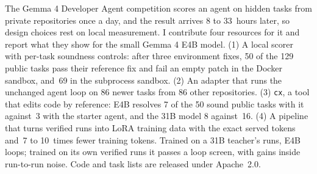 The Gemma 4 Developer Agent competition scores an agent on hidden tasks from private repositories once a day, and the result arrives 8 to 33~hours later, so design choices rest on local measurement. I contribute four resources for it and report what they show for the small Gemma 4 E4B model. (1) A local scorer with per-task soundness controls: after three environment fixes, 50 of the 129 public tasks pass their reference fix and fail an empty patch in the Docker sandbox, and~69 in the subprocess sandbox. (2) An adapter that runs the unchanged agent loop on 86 newer tasks from 86 other repositories. (3) \texttt{cx}, a tool that edits code by reference: E4B resolves 7 of the 50 sound public tasks with it against~3 with the starter agent, and the 31B model 8 against~16. (4) A pipeline that turns verified runs into LoRA training data with the exact served tokens and~7 to 10~times fewer training tokens. Trained on a 31B teacher's runs, E4B loops; trained on its own verified runs it passes a loop screen, with gains inside run-to-run noise. Code and task lists are released under Apache~2.0.
